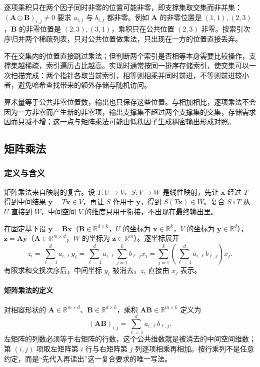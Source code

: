 逐项乘积只在两个因子同时非零的位置可能非零，即支撑集取交集而非并集：$(\bm A\odot\bm B)_{i,j}\neq0$ 要求 $a_{i,j}$ 与 $b_{i,j}$ 都非零。例如 $\bm A$ 的非零位置是 $(1,1),(2,3)$，$\bm B$ 的非零位置是 $(2,3),(3,1)$，乘积只在公共位置 $(2,3)$ 非零。按索引次序归并两个稀疏列表，只对公共位置做乘法，只出现在一方的位置直接丢弃。

不在交集内的位置直接跳过乘法；但判断两个索引是否相等本身需要比较操作，支撑集越稀疏，索引遍历占比越高。实现时通常按同一排序存储索引，使交集可以一次扫描完成：两个指针各取当前索引，相等则相乘并同时前进，不等则前进较小者，避免哈希查找带来的额外存储与随机访问。

算术量等于公共非零位置数，输出也只保存这些位置。与相加相比，逐项乘法不会因为一方非零而产生新的非零项，输出支撑集不超过两个支撑集的交集，存储需求因而只减不增；这一点与矩阵乘法可能由低秩因子生成稠密输出形成对照。

\subsection{矩阵乘法}

\subsubsection{定义与含义}

矩阵乘法来自映射的复合。设 $T:U\to V$、$S:V\to W$ 是线性映射，先让 $\bm x$ 经过 $T$ 得到中间结果 $\bm y=T\bm x\in V$，再让 $S$ 作用于 $\bm y$，得到 $S(T\bm x)\in W$。复合 $S\circ T$ 从 $U$ 直接到 $W$，中间空间 $V$ 的维度只用于衔接，不出现在最终输出里。

在固定基下设 $\bm y=\bm B\bm x$（$\bm B\in\mathbb R^{d\times k}$，$U$ 的坐标为 $\bm x\in\mathbb R^k$，$V$ 的坐标为 $\bm y\in\mathbb R^d$），$\bm z=\bm A\bm y$（$\bm A\in\mathbb R^{m\times d}$，$W$ 的坐标为 $\bm z\in\mathbb R^m$）。逐坐标展开
\[
 z_i=\sum_{\ell=1}^d a_{i,\ell}y_\ell
 =\sum_{\ell=1}^d a_{i,\ell}\sum_{j=1}^k b_{\ell,j}x_j
 =\sum_{j=1}^k\left(\sum_{\ell=1}^d a_{i,\ell}b_{\ell,j}\right)x_j.
\]
有限求和交换次序后，中间坐标 $y_\ell$ 被消去，$z_i$ 直接由 $x_j$ 表示。

\paragraph{矩阵乘法的定义}

对相容形状的 $\bm A\in\mathbb R^{m\times d}$、$\bm B\in\mathbb R^{d\times k}$，乘积 $\bm A\bm B\in\mathbb R^{m\times k}$ 定义为
\begin{equation}
 (\bm A\bm B)_{i,j}=\sum_{\ell=1}^d a_{i,\ell}b_{\ell,j}.
 \label{eq:linear-algebra-matrix-product}
\end{equation}
左矩阵的列数必须等于右矩阵的行数，这个公共维数就是被消去的中间空间维数；第 $(i,j)$ 项取左矩阵第 $i$ 行与右矩阵第 $j$ 列逐项相乘再相加。按行乘列不是任意约定，而是“先代入再读出”这一复合要求的唯一写法。

